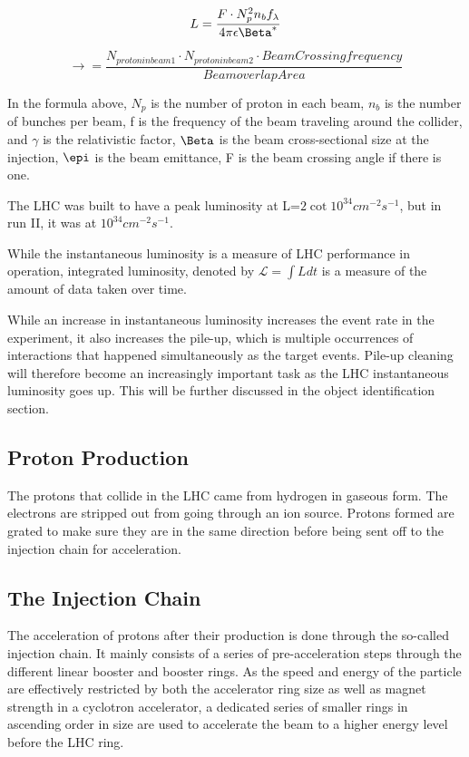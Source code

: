 \begin{equation}
L = \frac{F \cdot N^{2}_{p} n_{b} f_{\lambda}}{4\pi\epsilon \Beta^{*}}
\end{equation}


\begin{equation}
\rightarrow = \frac{N_{proton in beam 1} \cdot N_{proton in beam 2} \cdot Beam Crossing frequency}{Beam overlap Area} 
\end{equation}

In the formula above, $N_p$ is the number of proton in each beam, $n_{b}$ is the number of bunches per beam, f is the frequency of the beam traveling around the collider, and $\gamma$ is the relativistic factor, $\Beta^{\*}$ is the beam cross-sectional size at the injection, $\epi$ is the beam emittance, F is the beam crossing angle if there is one.

The LHC was built to have a peak luminosity at L=$2 \cot 10^{34}cm^{-2}s^{-1}$, but in run II, it was at $10^{34}cm^{-2}s^{-1}$.

While the instantaneous luminosity is a measure of LHC performance in operation, integrated luminosity, denoted by $\mathcal{L} = \int L dt$ is a measure of the amount of data taken over time.

While an increase in instantaneous luminosity increases the event rate in the experiment, it also increases the pile-up, which is multiple occurrences of interactions that happened simultaneously as the target events. Pile-up cleaning will therefore become an increasingly important task as the LHC instantaneous luminosity goes up. This will be further discussed in the object identification section. 


\subsection*{Proton Production}
The protons that collide in the LHC came from hydrogen in gaseous form. The electrons are stripped out from going through an ion source. Protons formed are grated to make sure they are in the same direction before being sent off to the injection chain for acceleration. 

\subsection*{The Injection Chain}
The acceleration of protons after their production is done through the so-called injection chain. It mainly consists of a series of pre-acceleration steps through the different linear booster and booster rings. As the speed and energy of the particle are effectively restricted by both the accelerator ring size as well as magnet strength in a cyclotron accelerator, a dedicated series of smaller rings in ascending order in size are used to accelerate the beam to a higher energy level before the LHC ring.

